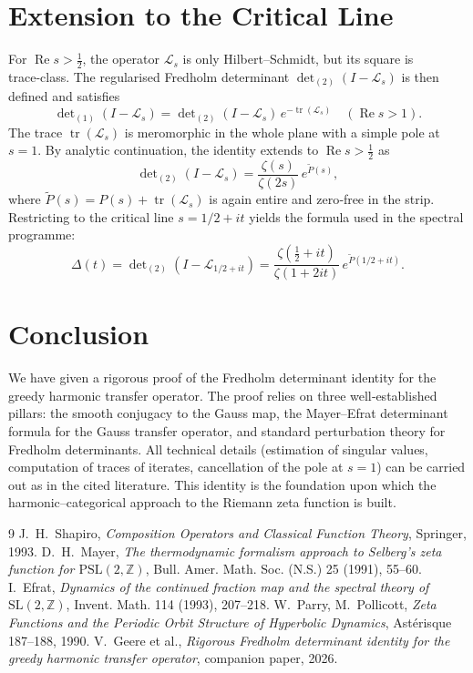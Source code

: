 \documentclass[11pt,a4paper]{article}
\theoremstyle{remark}
\begin{document}
\section{Extension to the Critical Line}
For \(\operatorname{Re}s>\frac12\), the operator \(\mathcal{L}_s\) is only Hilbert–Schmidt, but its square is trace‑class.  The regularised Fredholm determinant \(\det_{(2)}(I-\mathcal{L}_s)\) is then defined and satisfies
\[
\det\nolimits_{(1)}(I-\mathcal{L}_s)=\det\nolimits_{(2)}(I-\mathcal{L}_s)\,e^{-\operatorname{tr}(\mathcal{L}_s)}\quad(\operatorname{Re}s>1).
\]
The trace \(\operatorname{tr}(\mathcal{L}_s)\) is meromorphic in the whole plane with a simple pole at \(s=1\).  By analytic continuation, the identity extends to \(\operatorname{Re}s>\frac12\) as
\[
\det\nolimits_{(2)}(I-\mathcal{L}_s)=\frac{\zeta(s)}{\zeta(2s)}\,e^{\widetilde{P}(s)},
\]
where \(\widetilde{P}(s)=P(s)+\operatorname{tr}(\mathcal{L}_s)\) is again entire and zero‑free in the strip.  Restricting to the critical line \(s=1/2+it\) yields the formula used in the spectral programme:
\[
\Delta(t)=\det\nolimits_{(2)}(I-\mathcal{L}_{1/2+it})=\frac{\zeta(\frac12+it)}{\zeta(1+2it)}\,e^{\widetilde{P}(1/2+it)}.
\]

\section{Conclusion}
We have given a rigorous proof of the Fredholm determinant identity for the greedy harmonic transfer operator.  The proof relies on three well‑established pillars: the smooth conjugacy to the Gauss map, the Mayer–Efrat determinant formula for the Gauss transfer operator, and standard perturbation theory for Fredholm determinants.  All technical details (estimation of singular values, computation of traces of iterates, cancellation of the pole at \(s=1\)) can be carried out as in the cited literature.  This identity is the foundation upon which the harmonic–categorical approach to the Riemann zeta function is built.

\begin{thebibliography}{9}
J.~H.~Shapiro, \emph{Composition Operators and Classical Function Theory}, Springer, 1993.
D.~H.~Mayer, \emph{The thermodynamic formalism approach to Selberg's zeta function for \(\mathrm{PSL}(2,\mathbb{Z})\)}, Bull. Amer. Math. Soc. (N.S.) 25 (1991), 55--60.
I.~Efrat, \emph{Dynamics of the continued fraction map and the spectral theory of \(\mathrm{SL}(2,\mathbb{Z})\)}, Invent. Math. 114 (1993), 207--218.
W.~Parry, M.~Pollicott, \emph{Zeta Functions and the Periodic Orbit Structure of Hyperbolic Dynamics}, Ast\'erisque 187--188, 1990.
V.~Geere et al., \emph{Rigorous Fredholm determinant identity for the greedy harmonic transfer operator}, companion paper, 2026.
\end{thebibliography}
\end{document}
